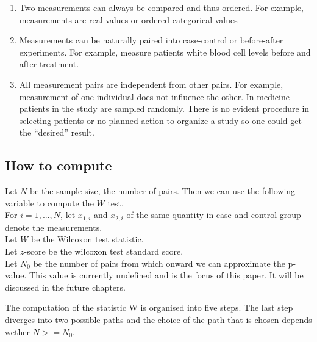 \documentclass[12pt]{article}
\begin{document}
\begin{enumerate}
  \item Two measurements can always be compared and thus ordered. For example, measurements are real values or ordered categorical values
  \item Measurements can be naturally paired into case-control or before-after experiments. For example, measure patients white blood cell levels before and after treatment.
  \item All measurement pairs are independent from other pairs. For example, measurement of one individual does not influence the other. In medicine patients in the study are sampled randomly. There is no evident procedure in selecting patients or no planned action to organize a study so one could get the ``desired'' result.
\end{enumerate}

\subsection{How to compute}
Let $N$ be the sample size, the number of pairs. Then we can use the following variable to compute the $W$ test. \\For $i=1,...,N$, let $x_{1, i}$ and $x_{2, i}$ of the same quantity in case and control group denote the measurements. \\
Let $W$ be the Wilcoxon test statistic. \\
Let $z$-score be the wilcoxon test standard score. \\
Let $N_0$ be the number of pairs from which onward we can approximate the p-value. This value is currently undefined and is the focus of this paper. It will be discussed in the future chapters.

The computation of the statistic W is organised into five steps. The last step diverges into two possible paths and the choice of the path that is chosen depends wether $N  >= N_0$.
\end{document}

